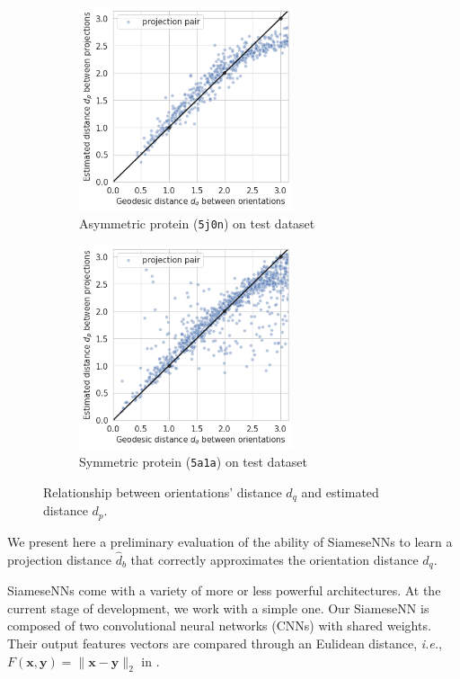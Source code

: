\begin{figure}
    \centering
    \begin{subfigure}[b]{0.45\textwidth}
        \includegraphics[height=6cm]{images/dPdQ_5j0n.png}
        \caption{Asymmetric protein (\texttt{5j0n}) on test dataset}
    \end{subfigure}
    \hfill
    \begin{subfigure}[b]{0.50\textwidth}
    \centering
        \includegraphics[height=6cm]{images/dPdQ_5a1a.png}
        \caption{Symmetric protein (\texttt{5a1a}) on test dataset}
    \end{subfigure}
    \caption{Relationship between orientations' distance $d_q$ and estimated distance $d_p$.}
    \label{fig:minim-loss-perfect-distances}
\end{figure}

We present here a preliminary evaluation of the ability of SiameseNNs to learn a projection distance $\widehat{d}_b$ that correctly approximates the orientation distance $d_q$.

SiameseNNs come with a variety of more or less powerful architectures.
At the current stage of development, we work with a simple one.
Our SiameseNN is composed of two convolutional neural networks (CNNs) with shared weights.
Their output features vectors are compared through an Eulidean distance, \textit{i.e.}, $F(\mathbf{x},\mathbf{y})=\lVert \mathbf{x}-\mathbf{y}\rVert_2$ in .

